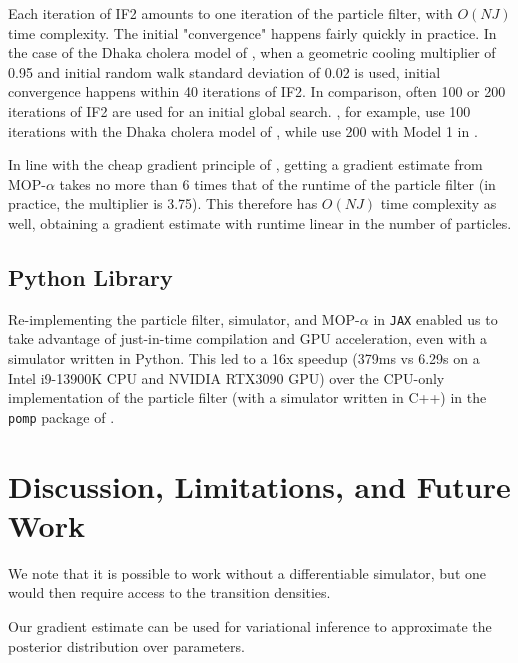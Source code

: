 \documentclass[9pt,twocolumn,twoside]{pnas-new}
\begin{document}
Each iteration of IF2 amounts to one iteration of the particle filter, with $O(NJ)$ time complexity. The initial "convergence" happens fairly quickly in practice. In the case of the Dhaka cholera model of \cite{king08}, when a geometric cooling multiplier of 0.95 and initial random walk standard deviation of 0.02 is used, initial convergence happens within 40 iterations of IF2. In comparison, often 100 or 200 iterations of IF2 are used for an initial global search. \cite{ionides15}, for example, use 100 iterations with the Dhaka cholera model of \cite{king08}, while \cite{wheeler23} use 200 with Model 1 in \cite{Lee_haiticholera}. 

In line with the cheap gradient principle of \cite{kakade2019provably}, getting a gradient estimate from MOP-$\alpha$ takes no more than 6 times that of the runtime of the particle filter (in practice, the multiplier is 3.75). This therefore has $O(NJ)$ time complexity as well, obtaining a gradient estimate with runtime linear in the number of particles.

\subsection{Python Library}

Re-implementing the particle filter, simulator, and MOP-$\alpha$ in \texttt{JAX} \cite{jax} enabled us to take advantage of just-in-time compilation and GPU acceleration, even with a simulator written in Python. This led to a 16x speedup (379ms vs 6.29s on a Intel i9-13900K CPU and NVIDIA RTX3090 GPU) over the CPU-only implementation of the particle filter (with a simulator written in C++) in the \texttt{pomp} package of \cite{king16}. 





\section{Discussion, Limitations, and Future Work}

We note that it is possible to work without a differentiable simulator, but one would then require access to the transition densities. 

Our gradient estimate can be used for variational inference to approximate the posterior distribution over parameters. 
\end{document}

